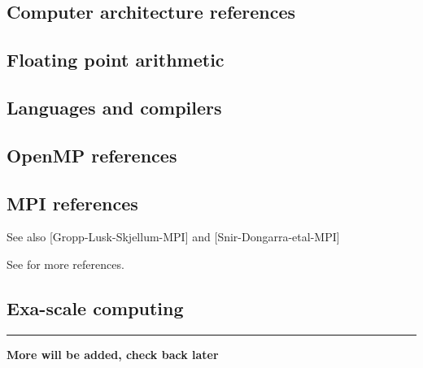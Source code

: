 \documentclass[letterpaper,10pt,english]{sphinxmanual}
\begin{document}
\subsection{Computer architecture references}
\label{biblio:computer-architecture-references}\label{biblio:biblio-computer-arch}

\subsection{Floating point arithmetic}
\label{biblio:floating-point-arithmetic}

\subsection{Languages and compilers}
\label{biblio:languages-and-compilers}

\subsection{OpenMP references}
\label{biblio:biblio-openmp}\label{biblio:openmp-references}

\subsection{MPI references}
\label{biblio:biblio-mpi}\label{biblio:mpi-references}
See also {[}Gropp-Lusk-Skjellum-MPI{]} and  {[}Snir-Dongarra-etal-MPI{]}

See {\hyperref[mpi:mpi]{}} for more references.


\subsection{Exa-scale computing}
\label{biblio:exa-scale-computing}

\bigskip\hrule{}\bigskip


\textbf{More will be added, check back later}
\end{document}
